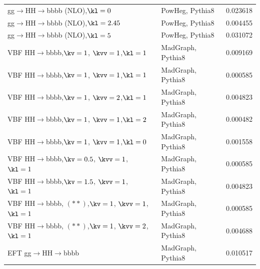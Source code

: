 \begin{table}[htb]
\begin{tabularx}{\textwidth}{lXr}
gg$\to$HH$\to$bbbb (NLO),$\kl = 0$     & PowHeg, Pythia8     & 0.023618\\
gg$\to$HH$\to$bbbb (NLO),$\kl = 2.45$  & PowHeg, Pythia8     & 0.004455\\
gg$\to$HH$\to$bbbb (NLO),$\kl = 5$     & PowHeg, Pythia8     & 0.031072\\
VBF HH$\to$bbbb,$\kv = 1$,  $\kvv = 1$,$\kl = 1$   &  MadGraph, Pythia8      & 0.009169\\
VBF HH$\to$bbbb,$\kv = 1$,  $\kvv = 1$,$\kl = 1$   &  MadGraph, Pythia8      & 0.000585\\
VBF HH$\to$bbbb,$\kv = 1$,  $\kvv = 2$,$\kl = 1$   &  MadGraph, Pythia8      & 0.004823\\
VBF HH$\to$bbbb,$\kv = 1$,  $\kvv = 1$,$\kl = 2$   &  MadGraph, Pythia8      & 0.000482\\
VBF HH$\to$bbbb,$\kv = 1$,  $\kvv = 1$,$\kl = 0$   &  MadGraph, Pythia8      & 0.001558\\
VBF HH$\to$bbbb,$\kv = 0.5$, $\kvv = 1$, $\kl = 1$ &  MadGraph, Pythia8      & 0.000585\\
VBF HH$\to$bbbb,$\kv = 1.5$, $\kvv = 1$, $\kl = 1$ &  MadGraph, Pythia8      & 0.004823\\
VBF HH$\to$bbbb, $(**)$,$\kv = 1$,  $\kvv = 1$,$\kl = 1$ & MadGraph, Pythia8 & 0.000585\\
VBF HH$\to$bbbb, $(**)$,$\kv = 1$,  $\kvv = 2$,$\kl = 1$ & MadGraph, Pythia8 & 0.004688\\
EFT gg$\to$HH$\to$bbbb                 & MadGraph, Pythia8   & 0.010517\\
\hline
\end{tabularx}
\end{table}


